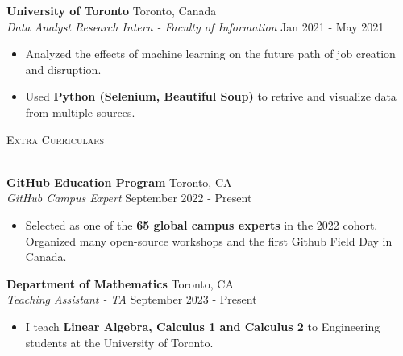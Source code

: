 \documentclass[a4paper]{article}
\newcommand{\lineunder} {
    \vspace*{-8pt} \\
    \hspace*{-18pt} \hrulefill \\
}
\newcommand{\header} [1] {
    {\hspace*{-18pt}\vspace*{6pt} \textsc{#1}}
    \vspace*{-6pt} \lineunder
}
\begin{document}
\textbf{University of Toronto} \hfill Toronto, Canada\\
\textit{Data Analyst Research Intern - Faculty of Information} \hfill Jan 2021 - May 2021\\
\vspace{-3mm}
\begin{itemize} \itemsep 1pt
    \item Analyzed the effects of machine learning on the future path of job creation and disruption.
	\item Used \textbf{Python (Selenium, Beautiful Soup)} to retrive and visualize data from multiple sources.
\end{itemize}


\header{Extra Curriculars}
\vspace{1mm}

\textbf{GitHub Education Program} \hfill Toronto, CA\\
\textit{GitHub Campus Expert} \hfill September 2022 - Present\\
\vspace{-3mm}
\begin{itemize} \itemsep 0.5pt
	\item Selected as one of the \textbf{65 global campus experts} in the 2022 cohort. Organized many open-source workshops and the first Github Field Day in Canada.
\end{itemize}

\textbf{Department of Mathematics} \hfill Toronto, CA\\
\textit{Teaching Assistant - TA} \hfill September 2023 - Present\\
\vspace{-3mm}
\begin{itemize} \itemsep 0.5pt
	\item I teach \textbf{Linear Algebra, Calculus 1 and Calculus 2} to Engineering students at the University of Toronto.
\end{itemize}
\end{document}
